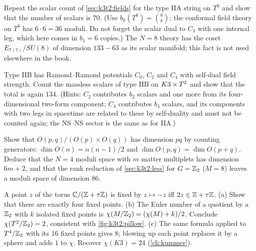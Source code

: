 \begin{exercise}[$\star$]
Repeat the scalar count of \cref{sec:k3t2:fields} for the type IIA string on $T^6$ and show
that the number of scalars is $70$. (Use $b_k(T^6)=\binom6k$; the conformal field theory on
$T^6$ has $6\cdot6=36$ moduli. Do not forget the scalar dual to $C_3$ with one internal leg,
which here comes in $b_1=6$ copies.) The $N=8$ theory has the coset $E_{7(7)}/SU(8)$ of
dimension $133-63$ as its scalar manifold; this fact is not used elsewhere in the book.
\end{exercise}

\begin{exercise}[$\star\star$]
Type IIB has Ramond--Ramond potentials $C_0$, $C_2$ and $C_4$ with self-dual field strength.
Count the massless scalars of type IIB on $K3\times T^2$ and show that the total is again $134$.
(Hints: $C_2$ contributes $b_2$ scalars and one more from its four-dimensional two-form
component; $C_4$ contributes $b_4$ scalars, and its components with two legs in spacetime
are related to these by self-duality and must not be counted again; the NS--NS sector is the
same as for IIA.)
\end{exercise}

\begin{exercise}[$\star\star$]
Show that $O(p,q)/(O(p)\times O(q))$ has dimension $pq$ by counting generators:
$\dim O(n)=n(n-1)/2$ and $\dim O(p,q)=\dim O(p+q)$. Deduce that the $N=4$ moduli space with
$m$ matter multiplets has dimension $6m+2$, and that the rank reduction of
\cref{sec:k3t2:less} for $G=\mathbb{Z}_2$ ($M=8$) leaves a moduli space of dimension $86$.
\end{exercise}

\begin{exercise}[$\star\star$]
A point $z$ of the torus $\mathbb{C}/(\mathbb{Z}+\tau\mathbb{Z})$ is fixed by $z\mapsto-z$ iff $2z\in\mathbb{Z}+\tau\mathbb{Z}$.
(a) Show that there are exactly four fixed points. (b) The Euler number of a quotient by a
$\mathbb{Z}_2$ with $k$ isolated fixed points is $\chi(M/\mathbb{Z}_2)=(\chi(M)+k)/2$. Conclude
$\chi(T^2/\mathbb{Z}_2)=2$, consistent with \cref{fig:k3t2:pillow}. (c) The same formula applied to
$T^4/\mathbb{Z}_2$ with its $16$ fixed points gives $8$; blowing up each point replaces it by a
sphere and adds $1$ to $\chi$. Recover $\chi(K3)=24$ (\cref{ch:kummer}).
\end{exercise}


